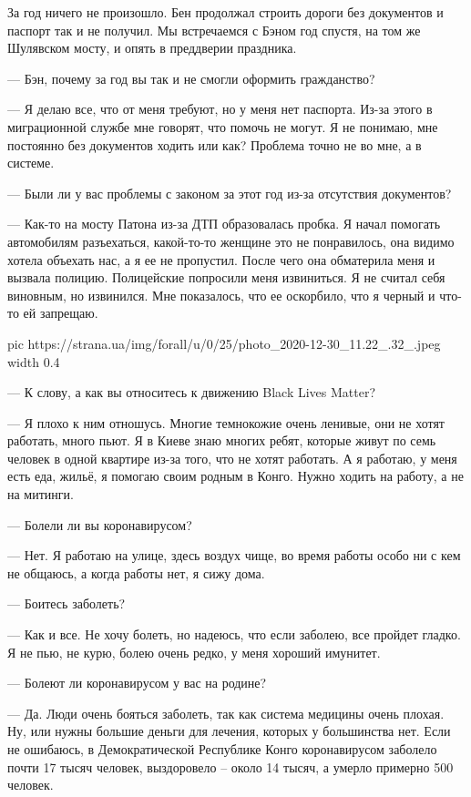 За год ничего не произошло. Бен продолжал строить дороги без документов и
паспорт так и не получил. Мы встречаемся с Бэном год спустя, на том же
Шулявском мосту, и опять в преддверии праздника.

— Бэн, почему за год вы так и не смогли оформить гражданство?

— Я делаю все, что от меня требуют, но у меня нет паспорта. Из-за этого в
миграционной службе мне говорят, что помочь не могут. Я не понимаю, мне
постоянно без документов ходить или как? Проблема точно не во мне, а в
системе.  

— Были ли у вас проблемы с законом за этот год из-за отсутствия
документов?

— Как-то на мосту Патона из-за ДТП образовалась пробка. Я начал помогать
автомобилям разъехаться, какой-то-то женщине это не понравилось, она
видимо хотела объехать нас, а я ее не пропустил. После чего она обматерила
меня и вызвала полицию. Полицейские попросили меня извиниться. Я не считал
себя виновным, но извинился. Мне показалось, что ее оскорбило, что я
черный и что-то ей запрещаю.  

\ifcmt
  pic https://strana.ua/img/forall/u/0/25/photo_2020-12-30_11.22_.32_.jpeg
  width 0.4
\fi

— К слову, а как вы относитесь к движению Black Lives Matter? 

— Я плохо к ним отношусь. Многие темнокожие очень ленивые, они не хотят
работать, много пьют. Я в Киеве знаю многих ребят, которые живут по семь
человек в одной квартире из-за того, что не хотят работать. А я работаю, у
меня есть еда, жильё, я помогаю своим родным в Конго. Нужно ходить на
работу, а не на митинги. 

— Болели ли вы коронавирусом? 

— Нет. Я работаю на улице, здесь воздух чище, во время работы особо ни с
кем не общаюсь, а когда работы нет, я сижу дома.  

— Боитесь заболеть? 

— Как и все. Не хочу болеть, но надеюсь, что если заболею, все пройдет
гладко. Я не пью, не курю, болею очень редко, у меня хороший имунитет.  

— Болеют ли коронавирусом у вас на родине? 

— Да. Люди очень бояться заболеть, так как система медицины очень плохая.
Ну, или нужны большие деньги для лечения, которых у большинства нет. Если
не ошибаюсь, в Демократической Республике Конго коронавирусом заболело
почти 17 тысяч человек, выздоровело – около 14 тысяч, а умерло примерно
500 человек.  



